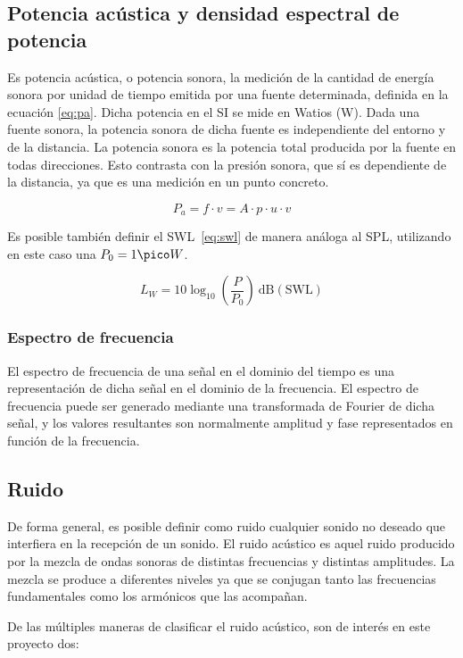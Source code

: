 \subsection{Potencia acústica y densidad espectral de potencia }
Es potencia acústica, o potencia sonora, la medición de la cantidad de energía sonora por unidad de tiempo emitida por una fuente determinada, definida en la ecuación \ref{eq:pa}. Dicha potencia en el \ac{SI} se mide en Watios (W). Dada una fuente sonora, la potencia sonora de dicha fuente es independiente del entorno y de la distancia. La potencia sonora es la potencia total producida por la fuente en todas direcciones. Esto contrasta con la presión sonora, que sí es dependiente de la distancia, ya que es una medición en un punto concreto.

\begin{equation}
P_a = f \cdot v = A \cdot p \cdot u \cdot v
\label{eq:pa}
\end{equation}

Es posible también definir el \ac{SWL}~\ref{eq:swl} de manera análoga al \ac{SPL}, utilizando en este caso una $P_0 = 1 \pico W$. 

\begin{equation}
L_W = 10 \log_{10}\left(\frac{P}{P_0}\right) ~\mathrm{dB (SWL)}
\label{eq:swl}
\end{equation}

\subsubsection{Espectro de frecuencia}
El espectro de frecuencia de una señal en el dominio del tiempo es una representación de dicha señal en el dominio de la frecuencia. El espectro de frecuencia puede ser generado mediante una transformada de Fourier de dicha señal, y los valores resultantes son normalmente amplitud y fase representados en función de la frecuencia.

\subsection{Ruido}
De forma general, es posible definir como ruido cualquier sonido no deseado que interfiera en la recepción de un sonido. El ruido acústico es aquel ruido producido por la mezcla de ondas sonoras de distintas frecuencias y distintas amplitudes. La mezcla se produce a diferentes niveles ya que se conjugan tanto las frecuencias fundamentales como los armónicos que las acompañan.

De las múltiples maneras de clasificar el ruido acústico, son de interés en este proyecto dos:

